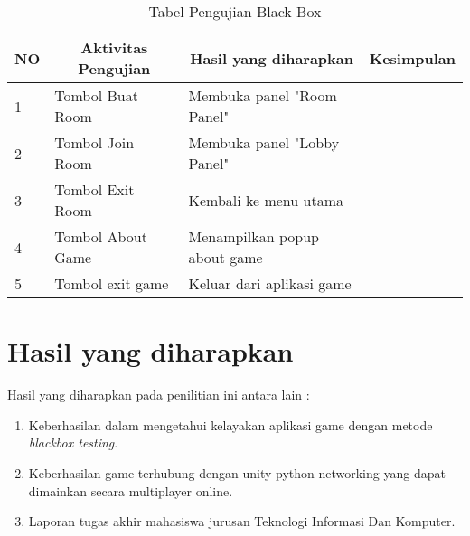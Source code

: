     \begin{table}[h]
    \centering
    \begin{tabular}{|l|l|l|l|}
    \hline
    \multicolumn{1}{|c|}{NO} & \multicolumn{1}{c|}{Aktivitas Pengujian} & \multicolumn{1}{c|}{Hasil yang diharapkan} & \multicolumn{1}{c|}{Kesimpulan} \\ \hline
    1                        & Tombol Buat Room                         & Membuka panel "Room Panel"                 &                                 \\ \hline
    2                        & Tombol Join Room                         & Membuka panel "Lobby Panel"                &                                 \\ \hline
    3                        & Tombol Exit Room                         & Kembali ke menu utama                      &                                 \\ \hline
    4                        & Tombol About Game                        & Menampilkan popup about game               &                                 \\ \hline
    5                        & Tombol exit game                         & Keluar dari aplikasi game                  &                                 \\ \hline
    \end{tabular}
    \caption{Tabel Pengujian Black Box}
    \label{lab:tabel-pengujian}
    \end{table}
        
\section{Hasil yang diharapkan}
Hasil yang diharapkan pada penilitian ini antara lain :
\begin{enumerate}
    \item Keberhasilan dalam mengetahui kelayakan aplikasi game dengan metode \textit{blackbox testing}.
    \item Keberhasilan game terhubung dengan unity python networking yang dapat dimainkan secara multiplayer online.
    \item Laporan tugas akhir mahasiswa jurusan Teknologi Informasi Dan Komputer.
\end{enumerate}
